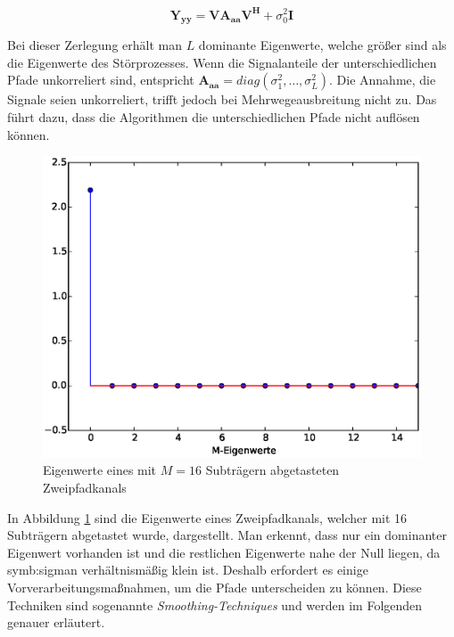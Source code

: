\begin{equation}
	\label{eq:Trennung von Signal und Rauschraum}
	\mathbf{Y_{yy}} = \mathbf{VA_{aa}V^H} + \sigma_0^2 \mathbf{I}
\end{equation}

Bei dieser Zerlegung erhält man $L$ dominante Eigenwerte, welche größer sind als die Eigenwerte des Störprozesses. Wenn die Signalanteile der unterschiedlichen Pfade unkorreliert sind, entspricht $\mathbf{A_{aa}} = diag(\sigma_1^2,  \ldots, \sigma_L^2)$.  Die Annahme, die Signale seien unkorreliert, trifft jedoch bei Mehrwegeausbreitung nicht zu. Das führt dazu, dass die Algorithmen die unterschiedlichen Pfade nicht auflösen können.

\begin{figure}[htbp]
	\centering
	\includegraphics[scale=0.5]{images/OneDominant}
	\caption{Eigenwerte eines mit $M = 16$ Subträgern abgetasteten Zweipfadkanals}
	\label{fig:OneDominant}

\end{figure}

In Abbildung \ref{fig:OneDominant} sind die Eigenwerte eines Zweipfadkanals, welcher mit 16 Subträgern abgetastet wurde, dargestellt. Man erkennt, dass nur ein dominanter Eigenwert vorhanden ist und die restlichen Eigenwerte nahe der Null liegen, da \gls{symb:sigman} verhältnismäßig klein ist. 
Deshalb erfordert es einige Vorverarbeitungsmaßnahmen, um die Pfade unterscheiden zu können. Diese Techniken sind sogenannte \emph{Smoothing-Techniques} und werden im Folgenden genauer erläutert. 

